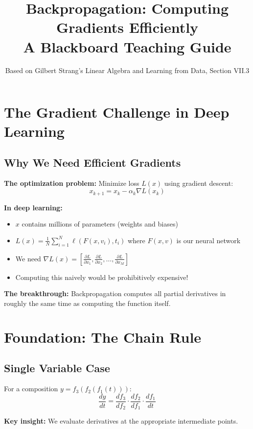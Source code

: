 \documentclass[11pt]{article}
\title{Backpropagation: Computing Gradients Efficiently\\
\large A Blackboard Teaching Guide}
\author{Based on Gilbert Strang's Linear Algebra and Learning from Data, Section VII.3}
\date{}
\begin{document}
\maketitle

\section{The Gradient Challenge in Deep Learning}

\subsection{Why We Need Efficient Gradients}
\textbf{The optimization problem:} Minimize loss $L(x)$ using gradient descent:
\begin{equation}
x_{k+1} = x_k - \alpha_k \nabla L(x_k)
\end{equation}

\textbf{In deep learning:}
\begin{itemize}
\item $x$ contains millions of parameters (weights and biases)
\item $L(x) = \frac{1}{N}\sum_{i=1}^N \ell(F(x, v_i), t_i)$ where $F(x,v)$ is our neural network
\item We need $\nabla L(x) = [\frac{\partial L}{\partial x_1}, \frac{\partial L}{\partial x_2}, \ldots, \frac{\partial L}{\partial x_M}]$
\item Computing this naively would be prohibitively expensive!
\end{itemize}

\textbf{The breakthrough:} Backpropagation computes all partial derivatives in roughly the same time as computing the function itself.

\section{Foundation: The Chain Rule}

\subsection{Single Variable Case}
For a composition $y = f_3(f_2(f_1(t)))$:
\begin{equation}
\frac{dy}{dt} = \frac{df_3}{df_2} \cdot \frac{df_2}{df_1} \cdot \frac{df_1}{dt}
\end{equation}

\textbf{Key insight:} We evaluate derivatives at the appropriate intermediate points.
\end{document}
